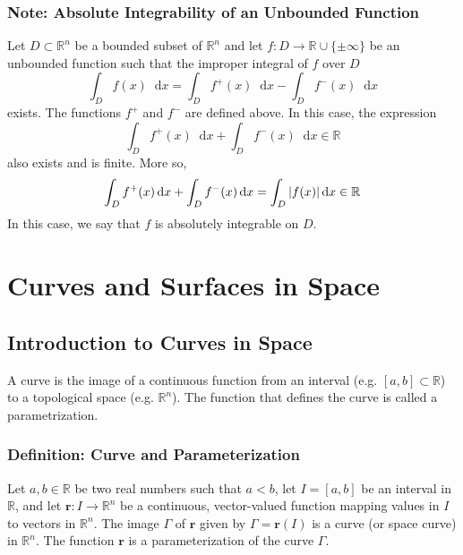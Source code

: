 \documentclass[11pt, a4paper]{article}
\newcommand{\diff}{\mathop{}\!\mathrm{d}} %
\begin{document}
\subsubsection{Note: Absolute Integrability of an Unbounded Function}
Let $ D \subset \mathbb{R}^n $ be a bounded subset of $ \mathbb{R}^{n} $ and let $ f : D \rightarrow \mathbb{R} \cup \{\pm \infty \} $ be an unbounded function such that the improper integral of $ f $ over $ D $
\begin{equation*}
\int_D f(x) \diff x = \int_D f^+(x) \diff x - \int_D f^-(x) \diff x
\end{equation*}
exists. The functions $ f^+ $ and $ f^- $ are defined above. In this case, the expression 
\begin{equation*}
	\int_D f^+(x) \diff x + \int_D f^-(x) \diff x \in \mathbb{R}
\end{equation*}
also exists and is finite. More so,
\begin{equation*}
\int_D f^+(x) \diff x + \int_D f^-(x) \diff x = \int_D \abs{f(x)} \diff x \in \mathbb{R}
\end{equation*}
In this case, we say that $ f $ is absolutely integrable on $ D $.

\newpage


\section{Curves and Surfaces in Space}

\subsection{Introduction to Curves in Space}

A curve is the image of a continuous function from an interval (e.g. $ [a, b] \subset \mathbb{R}  $) to a topological space (e.g. $ \mathbb{R}^n $). The function that defines the curve is called a parametrization.

\subsubsection{Definition: Curve and Parameterization}
Let $ a, b \in \mathbb{R} $ be two real numbers such that $ a < b $, let $ I = [a, b] $ be an interval in $ \mathbb{R} $, and let $ \bm{r} : I \rightarrow \mathbb{R}^n$ be a continuous, vector-valued function mapping values in $ I $ to vectors in $ \mathbb{R}^n $. The image $ \Gamma $ of $ \bm{r} $ given by $ \Gamma 
= \bm{r}(I) $ is a curve (or space curve) in $ \mathbb{R}^n $. The function $ \bm{r} $ is a parameterization of the curve $ \Gamma $.
\end{document}
